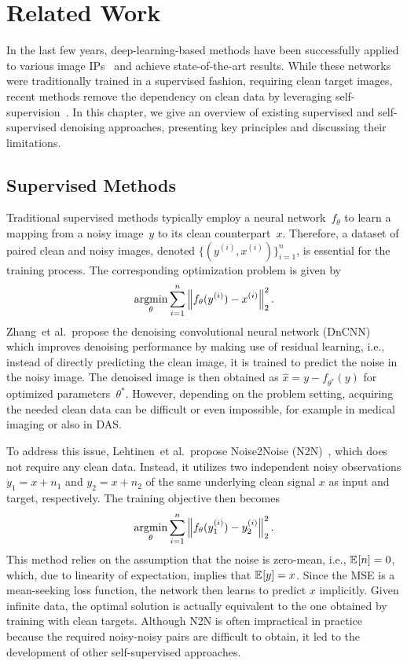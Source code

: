 \chapter{Related Work}

In the last few years, deep-learning-based methods have been successfully applied to various image IPs~\cite{DN,SR,IP} and achieve state-of-the-art results.
While these networks were traditionally trained in a supervised fashion, requiring clean target images, recent methods remove the dependency on clean data by leveraging self-supervision~\cite{SelfSupervisedDenoising}.
In this chapter, we give an overview of existing supervised and self-supervised denoising approaches, presenting key principles and discussing their limitations.

\section{Supervised Methods}

Traditional supervised methods typically employ a neural network~$f_\theta$ to learn a mapping from a noisy image~$y$ to its clean counterpart~$x$.
Therefore, a dataset of paired clean and noisy images, denoted $\{(y^{(i)},x^{(i)})\}_{i=1}^n$, is essential for the training process.
The corresponding optimization problem is given by
\begin{equation}\label{eq:N2C}
    \operatorname*{argmin}_\theta \sum_{i=1}^{n} \left\lVert f_\theta(y^{(i)}) - x^{(i)}\right\rVert_2^2.
\end{equation}
Zhang~et al.\ propose the denoising convolutional neural network (DnCNN)~\cite{DnCNN} which improves denoising performance by making use of residual learning, i.e., instead of directly predicting the clean image, it is trained to predict the noise in the noisy image.
The denoised image is then obtained as $\hat{x} = y - f_{\theta^*}(y)$ for optimized parameters~$\theta^*$.
However, depending on the problem setting, acquiring the needed clean data can be difficult or even impossible, for example in medical imaging or also in DAS\@.

To address this issue, Lehtinen~et al.\ propose Noise2Noise (N2N)~\cite{N2N}, which does not require any clean data.
Instead, it utilizes two independent noisy observations $y_1 = x + n_1$ and $y_2 = x + n_2$ of the same underlying clean signal $x$ as input and target, respectively.
The training objective then becomes
\begin{equation}\label{eq:N2N}
    \operatorname*{argmin}_\theta \sum_{i=1}^{n} \left\lVert f_\theta(y_1^{(i)}) - y_2^{(i)}\right\rVert_2^2.
\end{equation}
This method relies on the assumption that the noise is zero-mean, i.e., $\mathbb{E}_{ } [n] = 0$, which, due to linearity of expectation, implies that $\mathbb{E}_{ } [y] = x$.
Since the MSE is a mean-seeking loss function, the network then learns to predict $x$ implicitly.
Given infinite data, the optimal solution is actually equivalent to the one obtained by training with clean targets.
Although N2N is often impractical in practice because the required noisy-noisy pairs are difficult to obtain, it led to the development of other self-supervised approaches.

